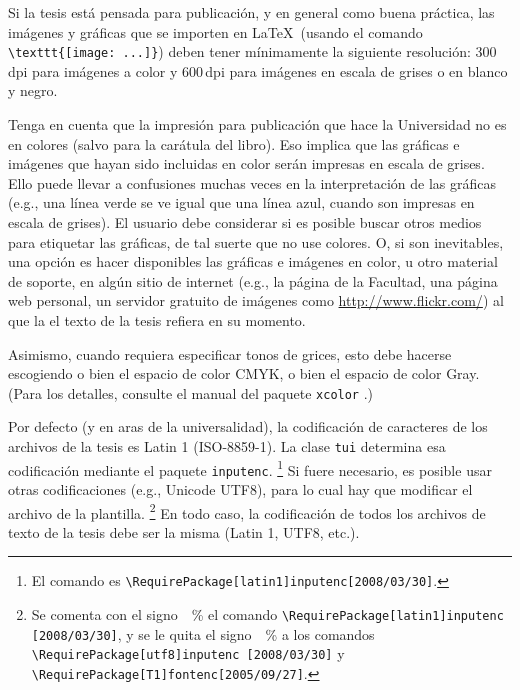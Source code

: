 \documentclass[11pt,
              article,
              oneside
              ]{memoir}
\newcommand*{\paquete}[1]{\texttt{\color{NavyBlue}#1}\xspace}
\newcommand*{\tui}{{\normalfont\paquete{tui}}\xspace}
\begin{document}
\begin{compactenum}
  \item Si la tesis está pensada para publicación, y en general como buena práctica, las imágenes y gráficas que se importen en \LaTeX\ (usando el comando \verb+\texttt{[image: ...]}+) deben tener mínimamente la siguiente resolución: 300\,dpi para imágenes a color y 600\,dpi para imágenes en escala de grises o en blanco y negro.
  \item Tenga en cuenta que la impresión para publicación que hace la Universidad no es en colores (salvo para la carátula del libro). Eso implica que las gráficas e imágenes que hayan sido incluidas en color serán impresas en escala de grises. Ello puede llevar a confusiones muchas veces en la interpretación de las gráficas (e.g., una línea verde se ve igual que una línea azul, cuando son impresas en escala de grises). El usuario debe considerar si es posible buscar otros medios para etiquetar las gráficas, de tal suerte que no use colores. O, si son inevitables, una opción es hacer disponibles las gráficas e imágenes en color, u otro material de soporte, en algún sitio de internet (e.g., la página de la Facultad, una página web personal, un servidor gratuito de imágenes como \url{http://www.flickr.com/}) al que la el texto de la tesis refiera en su momento.
  \item Asimismo, cuando requiera especificar tonos de grices, esto debe hacerse escogiendo o bien el espacio de color CMYK, o bien el espacio de color Gray. (Para los detalles, consulte el manual del paquete \paquete{xcolor} \cite{XCOLOR}.)
  \item Por defecto (y en aras de la universalidad), la codificación de caracteres de los archivos de la tesis es Latin 1 (ISO-8859-1). La clase \tui determina esa codificación mediante el paquete \paquete{inputenc}.%
	\footnote{El comando es \texttt{\textbackslash{}RequirePackage[latin1]{inputenc}[2008/03/30]}.}
	Si fuere necesario, es posible usar otras codificaciones (e.g., Unicode UTF8), para lo cual hay que modificar el archivo de la plantilla.%
	\footnote{Se comenta con el signo\ \ \% el comando \texttt{\textbackslash{}RequirePackage[latin1]{inputenc} [2008/03/30]}, y se le quita el signo\ \ \% a los comandos \texttt{\textbackslash{}RequirePackage[utf8]{inputenc} [2008/03/30]} y \texttt{\textbackslash{}RequirePackage[T1]{fontenc}[2005/09/27]}.}
	En todo caso, la codificación de todos los archivos de texto de la tesis debe ser la misma (Latin 1, UTF8, etc.).

\end{compactenum}
\end{document}
